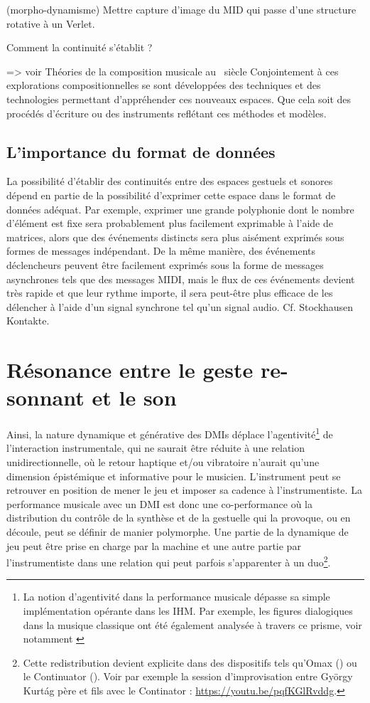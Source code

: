 (morpho-dynamisme)
Mettre capture d'image du MID qui passe d'une structure rotative à un Verlet.

Comment la continuité s'établit ?

=> voir Théories de la composition musicale au ~siècle
Conjointement à ces explorations compositionnelles se sont développées des techniques et des technologies permettant d’appréhender ces nouveaux espaces. Que cela soit des procédés d’écriture ou des instruments reflétant ces méthodes et modèles.

\subsection{L'importance du format de données}
La possibilité d'établir des continuités entre des espaces gestuels et sonores dépend en partie de la possibilité d'exprimer cette espace dans le format de données adéquat. Par exemple, exprimer une grande polyphonie dont le nombre d'élément est fixe sera probablement plus facilement exprimable à l'aide de matrices, alors que des événements distincts sera plus aisément exprimés sous formes de messages indépendant. De la même manière, des événements déclencheurs peuvent être facilement exprimés sous la forme de messages asynchrones tels que des messages MIDI, mais le flux de ces événements devient très rapide et que leur rythme importe, il sera peut-être plus efficace de les délencher à l'aide d'un signal synchrone tel qu'un signal audio. Cf. Stockhausen Kontakte.


\section{Résonance entre le geste re-sonnant et le son}

\noindent Ainsi, la nature dynamique et générative des DMIs déplace l'agentivité\footnote{La notion d'agentivité dans la performance musicale dépasse sa simple implémentation opérante dans les IHM. Par exemple, les figures dialogiques dans la musique classique ont été également analysée à travers ce prisme, voir notamment \cite{graybill_whose_2016}} de l'interaction instrumentale, qui ne saurait être réduite à une relation unidirectionnelle, où le retour haptique et/ou vibratoire n'aurait qu'une dimension épistémique et informative pour le musicien.
L'instrument peut se retrouver en position de mener le jeu et imposer sa cadence à l'instrumentiste. La performance musicale avec un \gls{DMI} est donc une co-performance où la distribution du contrôle de la synthèse et de la gestuelle qui la provoque, ou en découle, peut se définir de manier polymorphe. Une partie de la dynamique de jeu peut être prise en charge par la machine et une autre partie par l'instrumentiste dans une relation qui peut parfois s'apparenter à un duo\footnote{Cette redistribution devient explicite dans des dispositifs tels qu'Omax (\cite{assayag_omax_2006}) ou le Continuator (\cite{pachet_continuator:_2003}). Voir par exemple la session d'improvisation entre György Kurtág père et fils avec le Continator : \url{https://youtu.be/pqfKGlRvddg}.}.

